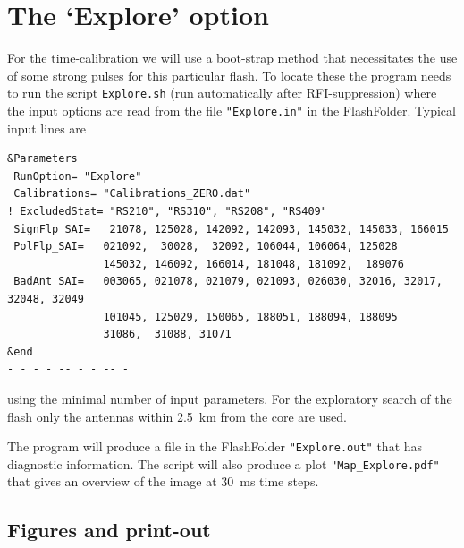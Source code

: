 \clearpage
\section{The `Explore' option}

For the time-calibration we will use a boot-strap method that necessitates the use of some strong pulses for this particular flash. To locate these the program needs to run the script \verb!Explore.sh! (run automatically after RFI-suppression) where the input options are read from the file \verb!"Explore.in"! in the FlashFolder. Typical input lines are

\begin{linenumbers}
\resetlinenumber
\begin{verbatim}
&Parameters
 RunOption= "Explore"
 Calibrations= "Calibrations_ZERO.dat"
! ExcludedStat= "RS210", "RS310", "RS208", "RS409"
 SignFlp_SAI=   21078, 125028, 142092, 142093, 145032, 145033, 166015
 PolFlp_SAI=   021092,  30028,  32092, 106044, 106064, 125028
               145032, 146092, 166014, 181048, 181092,  189076
 BadAnt_SAI=   003065, 021078, 021079, 021093, 026030, 32016, 32017, 32048, 32049
               101045, 125029, 150065, 188051, 188094, 188095
               31086,  31088, 31071
&end
- - - - -- - - -- -
\end{verbatim}
\end{linenumbers}
using the minimal number of input parameters. For the exploratory search of the flash only the antennas within 2.5~km from the core are used.

The program will produce a file in the FlashFolder \verb!"Explore.out"! that has diagnostic information. The script will also produce a plot \verb!"Map_Explore.pdf"! that gives an overview of the image at 30~ms time steps.

\subsection{Figures and print-out}

